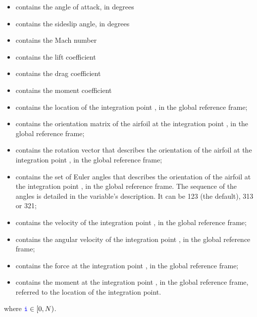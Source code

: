 \begin{itemize}
\item {} contains the angle of attack, in degrees

\item {} contains the sideslip angle, in degrees

\item {} contains the Mach number

\item {} contains the lift coefficient

\item {} contains the drag coefficient

\item {} contains the moment coefficient

\item {} contains the location
of the integration point , in the global reference frame;

\item {} contains the orientation matrix
of the airfoil at the integration point , in the global reference frame;

\item {} contains the rotation vector
that describes the orientation of the airfoil at the integration point ,
in the global reference frame;

\item {} contains the set of Euler angles
that describes the orientation of the airfoil at the integration point ,
in the global reference frame.
The sequence of the angles is detailed in the variable's description.
It can be 123 (the default), 313 or 321;

\item {} contains the velocity
of the integration point , in the global reference frame;

\item {} contains the angular velocity
of the integration point , in the global reference frame;

\item {} contains the force
at the integration point , in the global reference frame;

\item {} contains the moment
at the integration point , in the global reference frame,
referred to the location of the integration point.
\end{itemize}
where $\textcolor{blue}{\texttt{i}} \in [0,N)$.

